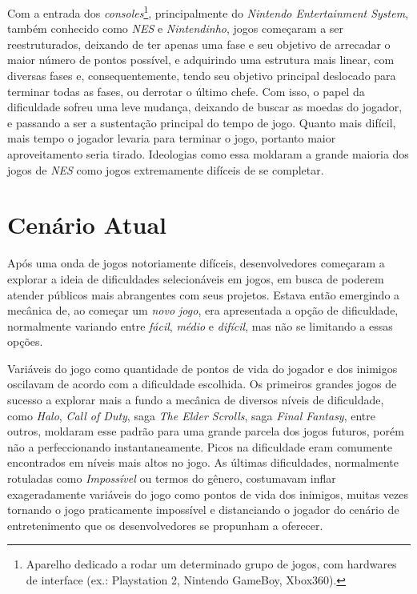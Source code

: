Com a entrada dos \textit{consoles}\footnote{
    Aparelho dedicado a rodar um determinado grupo de jogos, com hardwares de interface (ex.: Playstation 2, Nintendo GameBoy, Xbox360).
}, principalmente do \textit{Nintendo Entertainment System}, também conhecido como \textit{NES} e \textit{Nintendinho}, jogos começaram a ser reestruturados, deixando de ter apenas uma fase e seu objetivo de arrecadar o maior número de pontos possível, e adquirindo uma estrutura mais linear, com diversas fases e, consequentemente, tendo seu objetivo principal deslocado para terminar todas as fases, ou derrotar o último chefe. Com isso, o papel da dificuldade sofreu uma leve mudança, deixando de buscar as moedas do jogador, e passando a ser a sustentação principal do tempo de jogo. Quanto mais difícil, mais tempo o jogador levaria para terminar o jogo, portanto maior aproveitamento seria tirado. Ideologias como essa moldaram a grande maioria dos jogos de \textit{NES} como jogos extremamente difíceis de se completar.

\section{Cenário Atual}

Após uma onda de jogos notoriamente difíceis, desenvolvedores começaram a explorar a ideia de dificuldades selecionáveis em jogos, em busca de poderem atender públicos mais abrangentes com seus projetos. Estava então emergindo a mecânica de, ao começar um \textit{novo jogo}, era apresentada a opção de dificuldade, normalmente variando entre \textit{fácil}, \textit{médio} e \textit{difícil}, mas não se limitando a essas opções.

Variáveis do jogo como quantidade de pontos de vida do jogador e dos inimigos oscilavam de acordo com a dificuldade escolhida. Os primeiros grandes jogos de sucesso a explorar mais a fundo a mecânica de diversos níveis de dificuldade, como \textit{Halo}, \textit{Call of Duty}, saga \textit{The Elder Scrolls}, saga \textit{Final Fantasy}, entre outros, moldaram esse padrão para uma grande parcela dos jogos futuros, porém não a perfeccionando instantaneamente. Picos na dificuldade eram comumente encontrados em níveis mais altos no jogo. As últimas dificuldades, normalmente rotuladas como \textit{Impossível} ou termos do gênero, costumavam inflar exageradamente variáveis do jogo como pontos de vida dos inimigos, muitas vezes tornando o jogo praticamente impossível e distanciando o jogador do cenário de entretenimento que os desenvolvedores se propunham a oferecer.

